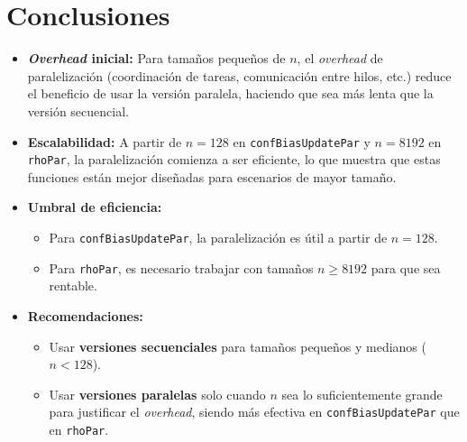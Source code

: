 \documentclass{article}
\begin{document}
\section{Conclusiones}
\begin{itemize}
    \item \textbf{\textit{Overhead} inicial:} Para tamaños pequeños de $n$, el \textit{overhead} de paralelización (coordinación de tareas, comunicación entre hilos, etc.) reduce el beneficio de usar la versión paralela, haciendo que sea más lenta que la versión secuencial.
    \item \textbf{Escalabilidad:} A partir de $n = 128$ en \texttt{confBiasUpdatePar} y $n = 8192$ en \texttt{rhoPar}, la paralelización comienza a ser eficiente, lo que muestra que estas funciones están mejor diseñadas para escenarios de mayor tamaño.
    \item \textbf{Umbral de eficiencia:}
    \begin{itemize}
        \item Para \texttt{confBiasUpdatePar}, la paralelización es útil a partir de $n = 128$.
        \item Para \texttt{rhoPar}, es necesario trabajar con tamaños $n \geq 8192$ para que sea rentable.
    \end{itemize}
    \item \textbf{Recomendaciones:}
    \begin{itemize}
        \item Usar \textbf{versiones secuenciales} para tamaños pequeños y medianos ($n < 128$).
        \item Usar \textbf{versiones paralelas} solo cuando $n$ sea lo suficientemente grande para justificar el \textit{overhead}, siendo más efectiva en \texttt{confBiasUpdatePar} que en \texttt{rhoPar}.
    \end{itemize}
\end{itemize}
\end{document}
